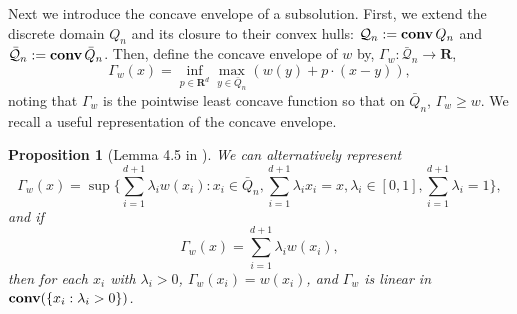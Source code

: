 \documentclass[12pt]{amsart}
\newcommand{\R}{\mathbf{R}}
\newcommand{\conv}{\mathop{\bf conv}}
\newcommand{\Co}{{\mathop {\bf Co}}} %
\newtheorem{prop}{Proposition}[section]
\begin{document}
Next we introduce the concave envelope of a subsolution. First, we extend the discrete domain $Q_n$ and its closure to their convex hulls: $\mathcal{Q}_n := \conv{Q_n}$ and
$\mathcal{\bar{Q}}_n := \conv{\bar{Q}}_n$. 
Then, define the concave envelope of $w$ by, $\Gamma_w:  \mathcal{\bar{Q}}_n \to \R$, 
\[
\Gamma_w(x) = \inf_{p \in \R^d} \max_{y \in \bar{Q}_n} \left( w(y) + p \cdot (x-y) \right), 
\]
noting that $\Gamma_w$ is the pointwise least concave function so that on $\bar{Q}_n$, $\Gamma_w \geq w$. We recall a useful representation
of the concave envelope. 


\begin{prop}[Lemma 4.5 in \cite{imbert2013introduction}] \label{prop:concave_rep}
We can alternatively represent
\[
\Gamma_w(x) = \sup\{ \sum_{i=1}^{d+1} \lambda_i w(x_i) : x_i \in  \bar{Q}_n, \sum_{i=1}^{d+1} \lambda_i x_i = x,  \lambda_i \in [0,1], \sum_{i=1}^{d+1} \lambda_i = 1\}, 
\]
and if 
\[
\Gamma_w(x) = \sum_{i=1}^{d+1} \lambda_i w(x_i) , 
\]
then for each $x_i$ with $\lambda_i > 0$, $\Gamma_w(x_i) = w(x_i)$, and $\Gamma_w$ is linear in $\conv(\{x_i : \lambda_i > 0\})$. %
\end{prop}

\end{document}
